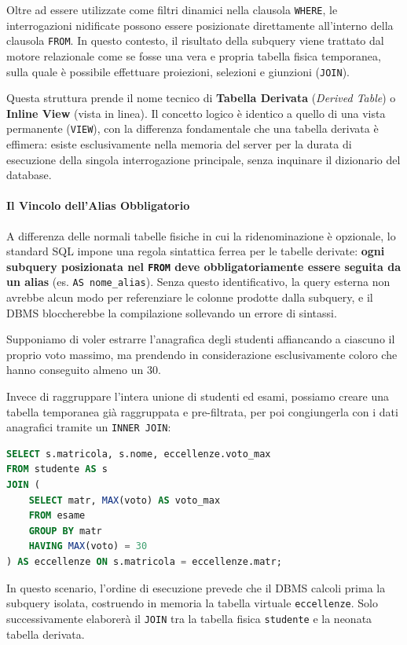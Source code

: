 Oltre ad essere utilizzate come filtri dinamici nella clausola \texttt{WHERE}, le interrogazioni nidificate possono essere posizionate direttamente all'interno della clausola \texttt{FROM}. In questo contesto, il risultato della subquery viene trattato dal motore relazionale come se fosse una vera e propria tabella fisica temporanea, sulla quale è possibile effettuare proiezioni, selezioni e giunzioni (\texttt{JOIN}).

Questa struttura prende il nome tecnico di \textbf{Tabella Derivata} (\textit{Derived Table}) o \textbf{Inline View} (vista in linea). Il concetto logico è identico a quello di una vista permanente (\texttt{VIEW}), con la differenza fondamentale che una tabella derivata è effimera: esiste esclusivamente nella memoria del server per la durata di esecuzione della singola interrogazione principale, senza inquinare il dizionario del database.

\paragraph{Il Vincolo dell'Alias Obbligatorio}
A differenza delle normali tabelle fisiche in cui la ridenominazione è opzionale, lo standard SQL impone una regola sintattica ferrea per le tabelle derivate: \textbf{ogni subquery posizionata nel \texttt{FROM} deve obbligatoriamente essere seguita da un alias} (es. \texttt{AS nome\_alias}). Senza questo identificativo, la query esterna non avrebbe alcun modo per referenziare le colonne prodotte dalla subquery, e il DBMS bloccherebbe la compilazione sollevando un errore di sintassi.

\begin{example}
Supponiamo di voler estrarre l'anagrafica degli studenti affiancando a ciascuno il proprio voto massimo, ma prendendo in considerazione esclusivamente coloro che hanno conseguito almeno un 30.

Invece di raggruppare l'intera unione di studenti ed esami, possiamo creare una tabella temporanea già raggruppata e pre-filtrata, per poi congiungerla con i dati anagrafici tramite un \texttt{INNER JOIN}:

\begin{lstlisting}[language=SQL, basicstyle=\ttfamily\small, keywordstyle=\color{blue}\bfseries]
SELECT s.matricola, s.nome, eccellenze.voto_max
FROM studente AS s
JOIN (
    SELECT matr, MAX(voto) AS voto_max
    FROM esame
    GROUP BY matr
    HAVING MAX(voto) = 30
) AS eccellenze ON s.matricola = eccellenze.matr;
\end{lstlisting}

In questo scenario, l'ordine di esecuzione prevede che il DBMS calcoli prima la subquery isolata, costruendo in memoria la tabella virtuale \texttt{eccellenze}. Solo successivamente elaborerà il \texttt{JOIN} tra la tabella fisica \texttt{studente} e la neonata tabella derivata.
\end{example}

